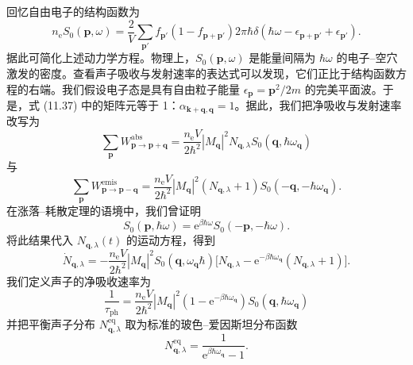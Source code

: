 回忆自由电子的结构函数为
\begin{equation*}
n_{\mathrm{e}}S_0(\mathbf{p},\omega)=\frac{2}{V}\sum_{\mathbf{p}'}f_{\mathbf{p}'}(1-f_{\mathbf{p}+\mathbf{p}'})2\pi\hbar\delta(\hbar\omega-\epsilon_{\mathbf{p}+\mathbf{p}'}+\epsilon_{\mathbf{p}'}).\tag{11.50}
\end{equation*}
据此可简化上述动力学方程。物理上，$S_0(\mathbf{p},\omega)$ 是能量间隔为 $\hbar\omega$ 的电子–空穴激发的密度。查看声子吸收与发射速率的表达式可以发现，它们正比于结构函数方程的右端。我们假设电子态是具有自由粒子能量 $\epsilon_{\mathbf{p}}=\mathbf{p}^2/2m$ 的完美平面波。于是，式 (11.37) 中的矩阵元等于 1：$\alpha_{\mathbf{k}+\mathbf{q},\mathbf{q}}=1$。据此，我们把净吸收与发射速率改写为
\begin{equation*}
\sum_{\mathbf{p}}W^{\mathrm{abs}}_{\mathbf{p}\to\mathbf{p}+\mathbf{q}}=\frac{n_{\mathrm{e}}V}{2\hbar^2}|M_{\mathbf{q}}|^2 N_{\mathbf{q},\lambda}S_0(\mathbf{q},\hbar\omega_{\mathbf{q}})\tag{11.51}
\end{equation*}
与
\begin{equation*}
\sum_{\mathbf{p}}W^{\mathrm{emis}}_{\mathbf{p}\to\mathbf{p}-\mathbf{q}}=\frac{n_{\mathrm{e}}V}{2\hbar^2}|M_{\mathbf{q}}|^2(N_{\mathbf{q},\lambda}+1)S_0(-\mathbf{q},-\hbar\omega_{\mathbf{q}}).\tag{11.52}
\end{equation*}
在涨落–耗散定理的语境中，我们曾证明
\begin{equation*}
S_0(\mathbf{p},\hbar\omega)=\mathrm{e}^{\beta\hbar\omega}S_0(-\mathbf{p},-\hbar\omega).\tag{11.53}
\end{equation*}
将此结果代入 $N_{\mathbf{q},\lambda}(t)$ 的运动方程，得到
\begin{equation*}
\dot{N}_{\mathbf{q},\lambda}=-\frac{n_{\mathrm{e}}V}{2\hbar^2}|M_{\mathbf{q}}|^2 S_0(\mathbf{q},\omega_{\mathbf{q}}\hbar)\bigl[N_{\mathbf{q},\lambda}-\mathrm{e}^{-\beta\hbar\omega_{\mathbf{q}}}(N_{\mathbf{q},\lambda}+1)\bigr].\tag{11.54}
\end{equation*}
我们定义声子的净吸收速率为
\begin{equation*}
\frac{1}{\tau_{\mathrm{ph}}}=\frac{n_{\mathrm{e}}V}{2\hbar^2}|M_{\mathbf{q}}|^2(1-\mathrm{e}^{-\beta\hbar\omega_{\mathbf{q}}})S_0(\mathbf{q},\hbar\omega_{\mathbf{q}})\tag{11.55}
\end{equation*}
并把平衡声子分布 $N^{\mathrm{eq}}_{\mathbf{q},\lambda}$ 取为标准的玻色–爱因斯坦分布函数
\begin{equation*}
N^{\mathrm{eq}}_{\mathbf{q},\lambda}=\frac{1}{\mathrm{e}^{\beta\hbar\omega_{\mathbf{q}}}-1}.\tag{11.56}
\end{equation*}
